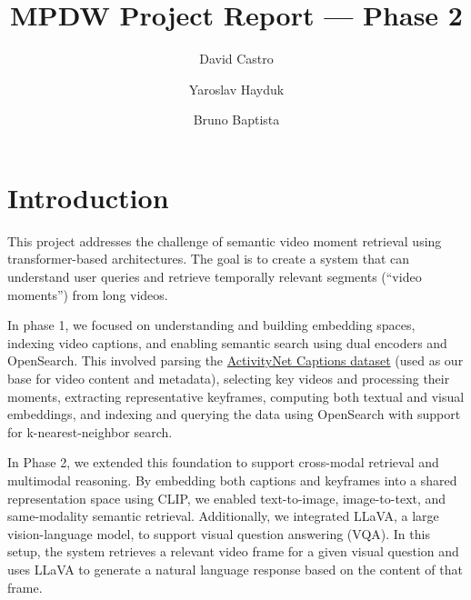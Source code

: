 \documentclass[runningheads]{llncs}
\begin{document}
\raggedbottom
\sloppy

\setlength{\textfloatsep}{10pt plus 2pt minus 4pt}
\setlength{\intextsep}{10pt plus 2pt minus 4pt}

\title{MPDW Project Report --- Phase 2}
\author{David Castro \and
Yaroslav Hayduk \and
Bruno Baptista}
%
%
%
\maketitle              %
%


%
%
%
\vspace{2\baselineskip plus 0.5\baselineskip minus 0.5\baselineskip}

\section{Introduction}
This project addresses the challenge of semantic video moment retrieval using transformer-based architectures. The goal is to create a system that can understand user queries and retrieve temporally relevant segments (``video moments'') from long videos.

In phase 1, we focused on understanding and building embedding spaces, indexing video captions, and enabling semantic search using dual encoders and OpenSearch. This involved parsing the \href{https://huggingface.co/datasets/HuggingFaceM4/ActivitiyNet_Captions}{ActivityNet Captions dataset} (used as our base for video content and metadata), selecting key videos and processing their moments, extracting representative keyframes, computing both textual and visual embeddings, and indexing and querying the data using OpenSearch with support for k-nearest-neighbor search.

In Phase 2, we extended this foundation to support cross-modal retrieval and multimodal reasoning. By embedding both captions and keyframes into a shared representation space using CLIP, we enabled text-to-image, image-to-text, and same-modality semantic retrieval. Additionally, we integrated LLaVA, a large vision-language model, to support visual question answering (VQA). In this setup, the system retrieves a relevant video frame for a given visual question and uses LLaVA to generate a natural language response based on the content of that frame.
\end{document}
